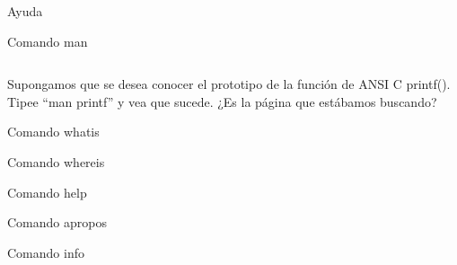 \begin{section}{Ayuda}
\begin{subsection}{Comando man}
\begin{lstlisting}[style=Ubuntu]
\end{lstlisting}

\begin{quoting}
Supongamos que se desea conocer el prototipo de la función de ANSI C printf(). Tipee “man printf” y vea que sucede. ¿Es la página que estábamos buscando?
\end{quoting}

\end{subsection}

\begin{subsection}{Comando whatis}
\end{subsection}

\begin{subsection}{Comando whereis}
\end{subsection}

\begin{subsection}{Comando help}
\end{subsection}

\begin{subsection}{Comando apropos}
\end{subsection}

\begin{subsection}{Comando info}
\end{subsection}

\end{section}